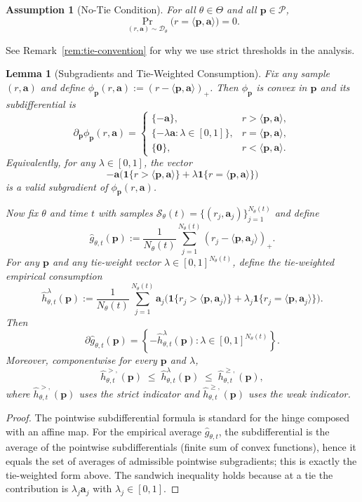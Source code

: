 \documentclass[11pt]{article}
\newtheorem{lemma}[theorem]{Lemma}
\newtheorem{assumption}[theorem]{Assumption}
\newcommand{\ba}{\mathbf{a}}
\newcommand{\bp}{\mathbf{p}}
\newcommand{\cP}{\mathcal{P}}
\newcommand{\cD}{\mathcal{D}}
\newcommand{\cS}{\mathcal{S}}
\begin{document}
\begin{assumption}[No-Tie Condition]
\label{assump:no-ties}
For all $\theta \in \Theta$ and all $\bp \in \cP$,
\[
\Pr_{(r,\ba) \sim \cD_\theta}\big(r = \langle \bp, \ba \rangle\big) = 0.
\]
\end{assumption}

See Remark~\ref{rem:tie-convention} for why we use strict thresholds in the analysis.

\begin{lemma}[Subgradients and Tie-Weighted Consumption]
\label{lem:subgradient}
Fix any sample $(r,\ba)$ and define $\phi_{\bp}(r,\ba):=(r-\langle \bp,\ba\rangle)_+$.
Then $\phi_{\bp}$ is convex in $\bp$ and its subdifferential is
\[
\partial_{\bp}\phi_{\bp}(r,\ba)=
\begin{cases}
\{-\ba\}, & r>\langle \bp,\ba\rangle,\\
\{-\lambda \ba:\lambda\in[0,1]\}, & r=\langle \bp,\ba\rangle,\\
\{\mathbf{0}\}, & r<\langle \bp,\ba\rangle.
\end{cases}
\]
Equivalently, for any $\lambda\in[0,1]$, the vector
\[
-\ba\Big(\mathbf{1}\{r>\langle \bp,\ba\rangle\}+\lambda\mathbf{1}\{r=\langle \bp,\ba\rangle\}\Big)
\]
is a valid subgradient of $\phi_{\bp}(r,\ba)$.

Now fix $\theta$ and time $t$ with samples $\cS_\theta(t)=\{(r_j,\ba_j)\}_{j=1}^{N_\theta(t)}$ and define
\[
\widehat g_{\theta,t}(\bp):=\frac1{N_\theta(t)}\sum_{j=1}^{N_\theta(t)}(r_j-\langle \bp,\ba_j\rangle)_+.
\]
For any $\bp$ and any tie-weight vector $\lambda\in[0,1]^{N_\theta(t)}$, define the tie-weighted empirical
consumption
\[
\widehat h_{\theta,t}^{\lambda}(\bp)
:=\frac1{N_\theta(t)}\sum_{j=1}^{N_\theta(t)}\ba_j\Big(\mathbf{1}\{r_j>\langle \bp,\ba_j\rangle\}
+\lambda_j\mathbf{1}\{r_j=\langle \bp,\ba_j\rangle\}\Big).
\]
Then
\[
\partial \widehat g_{\theta,t}(\bp)=\left\{-\widehat h_{\theta,t}^{\lambda}(\bp):\lambda\in[0,1]^{N_\theta(t)}\right\}.
\]
Moreover, componentwise for every $\bp$ and $\lambda$,
\[
\widehat h_{\theta,t}^{>,}(\bp)\;\le\;\widehat h_{\theta,t}^{\lambda}(\bp)\;\le\;\widehat h_{\theta,t}^{\ge,}(\bp),
\]
where $\widehat h_{\theta,t}^{>,}(\bp)$ uses the strict indicator and $\widehat h_{\theta,t}^{\ge,}(\bp)$ uses
the weak indicator.
\end{lemma}

\begin{proof}
The pointwise subdifferential formula is standard for the hinge composed with an affine map.
For the empirical average $\widehat g_{\theta,t}$, the subdifferential is the average of the pointwise
subdifferentials (finite sum of convex functions), hence it equals the set of averages of admissible
pointwise subgradients; this is exactly the tie-weighted form above. The sandwich inequality holds because
at a tie the contribution is $\lambda_j\ba_j$ with $\lambda_j\in[0,1]$.
\end{proof}
\end{document}
